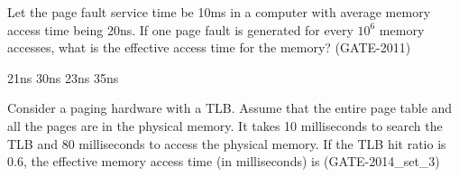 
\begin{questyle}

  \question Let the page fault service time be 10ms in a computer with average memory access time being 20ns.
            If one page fault is generated for every {\large \(10^6\) }  memory accesses, what is the effective access time
            for the memory? (GATE-2011)

  \begin{choices}
    \choice 21ns
    \correctchoice 30ns
    \choice 23ns
    \choice 35ns
  \end{choices}

\end{questyle}


\begin{questyle}

  \question  Consider a paging hardware with a TLB. Assume that the entire page table and all the pages
            are in the physical memory. It takes 10 milliseconds to search the TLB and 80 milliseconds to
            access the physical memory. If the TLB hit ratio is 0.6, the effective memory access
            time (in milliseconds) is \fillin[122] (GATE-2014\_set\_3)

\end{questyle}




















